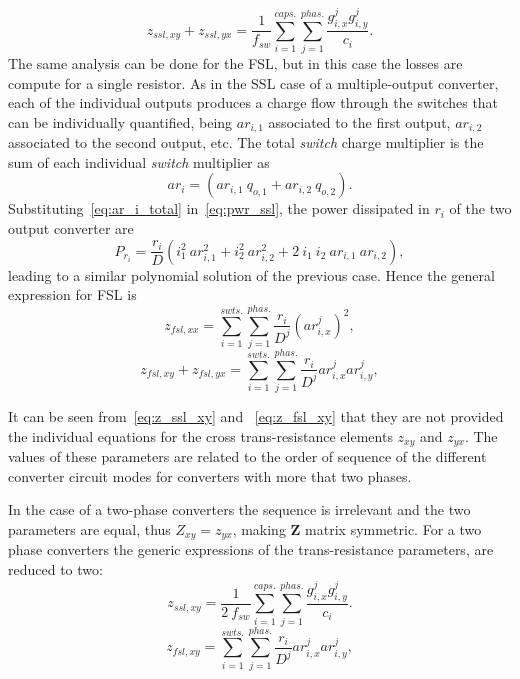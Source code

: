 \begin{equation}
  z_{ssl,xy} + z_{ssl,yx} =  \frac{1}{f_{sw}} \sum_{i=1}^{caps.} \sum_{j=1}^{phas.}
  \frac{g_{i,x}^j g_{i,y}^j}{c_i}.
 \label{eq:z_ssl_xy}
\end{equation}
The same analysis can be done for the FSL, but in this case the losses are compute for a single resistor.
As in the SSL case of a multiple-output converter, each of the individual outputs produces a charge flow through the switches that can be individually quantified, being $ar_{i,1}$ associated to the first output, $ar_{i,2}$ associated to the second output, etc. The total \emph{switch} charge multiplier is the sum of each individual \emph{switch} multiplier as
\begin{equation}
 ar_i =  (ar_{i,1} ~ q_{o,1} +  ar_{i,2} ~ q_{o,2}).
 \label{eq:ar_i_total}
\end{equation}
Substituting~\eqref{eq:ar_i_total} in~\eqref{eq:pwr_ssl}, the power dissipated in $r_i$ of the two output converter are
\begin{equation}
 P_{r_{i}} =  \frac{r_i}{D} (i_1^2 ~ar_{i,1}^2  +  i_2^2 ~ ar_{i,2}^2 + 2 ~ i_{1} ~ i_{2} ~ ar_{i,1}~ar_{i,2}),
 \label{eq:ploss_r_1}
\end{equation}
leading to a similar polynomial solution of the previous case. Hence the general expression for FSL is
\begin{equation}
  z_{fsl,xx} =   \sum_{i=1}^{swts.} \sum_{j=1}^{phas.}
  \frac{r_{i}}{D^j} \left ( ar_{i,x}^j \right )^2,
 \label{eq:z_fsl_xx}
\end{equation}
\begin{equation}
  z_{fsl,xy} + z_{fsl,yx} =   \sum_{i=1}^{swts.} \sum_{j=1}^{phas.}
  \frac{r_{i}}{D^j} ar_{i,x}^j ar_{i,y}^j,
 \label{eq:z_fsl_xy}
\end{equation}

It can be seen from~\eqref{eq:z_ssl_xy} and ~\eqref{eq:z_fsl_xy} that they are not provided the individual equations for the cross trans-resistance elements $z_{xy}$ and $z_{yx}$. The values of these parameters are related to the order of sequence of the different converter circuit modes for converters with more that two phases.

In the case of a two-phase converters the sequence is irrelevant and the two parameters are equal, thus $Z_{xy} = z_{yx}$, making $\mathbf{Z}$ matrix symmetric.  For a two phase converters the generic expressions of the trans-resistance parameters, are reduced to two:
\begin{equation}
  z_{ssl,xy}  =  \frac{1}{2~f_{sw}} \sum_{i=1}^{caps.} \sum_{j=1}^{phas.}
  \frac{g_{i,x}^j g_{i,y}^j}{c_i}.
 \label{eq:z_ssl_xy_2ph}
\end{equation}
\begin{equation}
  z_{fsl,xy} =   \sum_{i=1}^{swts.} \sum_{j=1}^{phas.}
  \frac{r_{i}}{D^j} ar_{i,x}^j ar_{i,y}^j,
 \label{eq:z_fsl_xy_2ph}
\end{equation}

